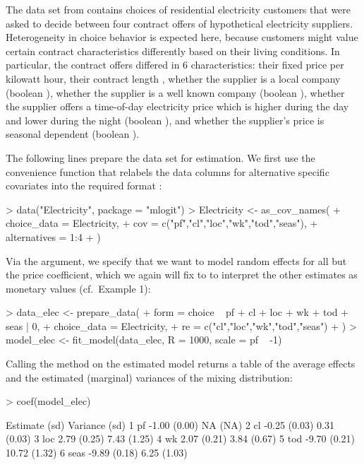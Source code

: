 \documentclass[article]{jss}
\newcommand{\fct}[1]{\code{#1()}}
\begin{document}
The  data set from  contains choices of residential electricity customers that were asked to decide between four contract offers of hypothetical electricity suppliers. Heterogeneity in choice behavior is expected here, because customers might value certain contract characteristics differently based on their living conditions. In particular, the contract offers differed in 6 characteristics: their fixed price  per kilowatt hour, their contract length , whether the supplier is a local company (boolean ), whether the supplier is a well known company (boolean ), whether the supplier offers a time-of-day electricity price which is higher during the day and lower during the night (boolean ), and whether the supplier's price is seasonal dependent (boolean ).

The following lines prepare the data set for estimation. We first use the convenience function \fct{as\_cov\_names} that relabels the data columns for alternative specific covariates into the required format :

\begin{Schunk}
\begin{Sinput}
> data("Electricity", package = "mlogit")
> Electricity <- as_cov_names(
+    choice_data = Electricity,
+    cov = c("pf","cl","loc","wk","tod","seas"),
+    alternatives = 1:4
+  )
\end{Sinput}
\end{Schunk}

Via the  argument, we specify that we want to model random effects for all but the price coefficient, which we again will fix to  to interpret the other estimates as monetary values (cf.\ Example 1):

\begin{Schunk}
\begin{Sinput}
> data_elec <- prepare_data(
+    form = choice ~ pf + cl + loc + wk + tod + seas | 0,
+    choice_data = Electricity,
+    re = c("cl","loc","wk","tod","seas")
+  )
> model_elec <- fit_model(data_elec, R = 1000, scale = pf ~ -1)
\end{Sinput}
\end{Schunk}

Calling the \fct{coef} method on the estimated model returns a table of the average effects and the estimated (marginal) variances of the mixing distribution:

\begin{Schunk}
\begin{Sinput}
> coef(model_elec)
\end{Sinput}
\begin{Soutput}
        Estimate   (sd) Variance   (sd)
1   pf     -1.00 (0.00)       NA   (NA)
2   cl     -0.25 (0.03)     0.31 (0.03)
3  loc      2.79 (0.25)     7.43 (1.25)
4   wk      2.07 (0.21)     3.84 (0.67)
5  tod     -9.70 (0.21)    10.72 (1.32)
6 seas     -9.89 (0.18)     6.25 (1.03)
\end{Soutput}
\end{Schunk}
\end{document}
